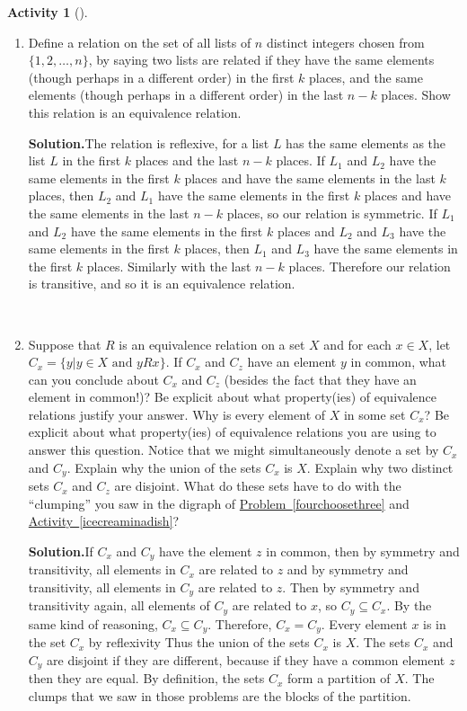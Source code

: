 \documentclass[10pt,]{book}
\theoremstyle{plain}
\theoremstyle{definition}
\newtheorem{activity}[project]{Activity}
\numberwithin{equation}{chapter}
\begin{document}
\begin{activity}[]
\begin{enumerate}[label=(\alph*)]
~\par
\item Define a relation on the set of all lists of \(n\) distinct integers chosen from \(\{1,2,\ldots, n\}\), by saying two lists are related if they have the same elements (though perhaps in a different order) in the first \(k\) places, and the same elements (though perhaps in a different order) in the last \(n-k\) places. Show this relation is an equivalence relation.%
\par\medskip\noindent%
\textbf{Solution.}\quad The relation is reflexive, for a list \(L\) has the same elements as the list \(L\) in the first \(k\) places and the last \(n-k\) places. If \(L_1\) and \(L_2\) have the same elements in the first \(k\) places and have the same elements in the last \(k\) places, then \(L_2\) and \(L_1\) have the same elements in the first \(k\) places and have the same elements in the last \(n-k\) places, so our relation is symmetric. If \(L_1\) and \(L_2\) have the same elements in the first \(k\) places and \(L_2\) and \(L_3\) have the same elements in the first \(k\) places, then \(L_1\) and \(L_3\) have the same elements in the first \(k\) places. Similarly with the last \(n-k\) places. Therefore our relation is transitive, and so it is an equivalence relation.%

~\par
\item Suppose that \(R\) is an equivalence relation on a set \(X\) and for each \(x\in X\), let \(C_x = \{y| y\in X \mbox{ and } 
yRx\}\). If \(C_x\) and \(C_z\) have an element \(y\) in common, what can you conclude about \(C_x\) and \(C_z\) (besides the fact that they have an element in common!)? Be explicit about what property(ies) of equivalence relations justify your answer. Why is every element of \(X\) in some set \(C_x\)? Be explicit about what property(ies) of equivalence relations you are using to answer this question. Notice that we might simultaneously denote a set by \(C_x\) and \(C_y\). Explain why the union of the sets \(C_x\) is \(X\). Explain why two distinct sets \(C_x\) and \(C_z\) are disjoint. What do these sets have to do with the ``clumping'' you saw in the digraph of \hyperref[fourchoosethree]{Problem~\ref{fourchoosethree}} and \hyperref[icecreaminadish]{Activity~\ref{icecreaminadish}}?%
\par\medskip\noindent%
\textbf{Solution.}\quad If \(C_x\) and \(C_y\) have the element \(z\) in common, then by symmetry and transitivity, all elements in \(C_x\) are related to \(z\) and by symmetry and transitivity, all elements in \(C_y\) are related to \(z\). Then by symmetry and transitivity again, all elements of \(C_y\) are related to \(x\), so \(C_y\subseteq C_x\). By the same kind of reasoning, \(C_x\subseteq C_y\). Therefore, \(C_x=C_y\). Every element \(x\) is in the set \(C_x\) by reflexivity Thus the union of the sets \(C_x\) is \(X\). The sets \(C_x\) and \(C_y\) are disjoint if they are different, because if they have a common element \(z\) then they are equal. By definition, the sets \(C_x\) form a partition of \(X\). The clumps that we saw in those problems are the blocks of the partition.%


\end{enumerate}
\end{activity}
\end{document}
